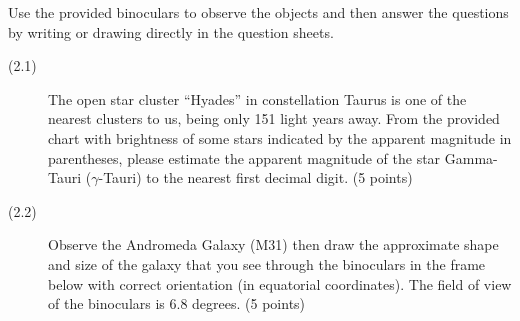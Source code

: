 Use the provided binoculars to observe the objects and then answer the
questions by writing or drawing directly in the question sheets.

\begin{description}
\item[(2.1)] The open star cluster ``Hyades'' in constellation Taurus is one
  of the nearest clusters to us, being only 151 light years away. From the
  provided chart with brightness of some stars indicated by the apparent
  magnitude in parentheses, please estimate the apparent magnitude of the
  star Gamma-Tauri ($\gamma$-Tauri) to the nearest first decimal digit.
  \hfill(5 points)


\item[(2.2)] Observe the Andromeda Galaxy (M31) then draw the approximate
  shape and size of the galaxy that you see through the binoculars in the
  frame below with correct orientation (in equatorial coordinates). The
  field of view of the binoculars is 6.8 degrees. \hfill(5 points)

\end{description}
